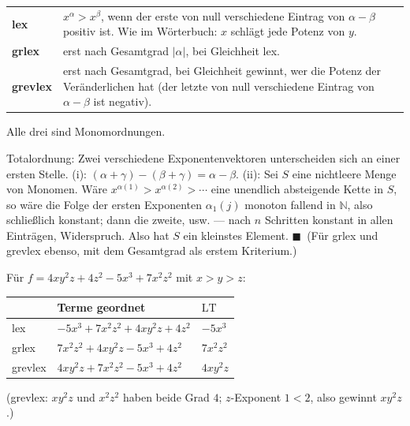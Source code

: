 \begin{merksatz}
\begin{center}
{\small
\renewcommand{\arraystretch}{1.5}
\begin{tabular}{@{}P{2.2cm}P{6.6cm}@{}}
\toprule
\textbf{lex} & $x^{\alpha} > x^{\beta}$, wenn der erste von null verschiedene Eintrag von $\alpha - \beta$ positiv ist. Wie im Wörterbuch: $x$ schlägt jede Potenz von $y$.\\
\textbf{grlex} & erst nach Gesamtgrad $|\alpha|$, bei Gleichheit lex.\\
\textbf{grevlex} & erst nach Gesamtgrad, bei Gleichheit gewinnt, wer die  Potenz der  Veränderlichen hat (der letzte von null verschiedene Eintrag von $\alpha - \beta$ ist negativ).\\
\bottomrule
\end{tabular}}
\end{center}
Alle drei sind Monomordnungen.

Totalordnung: Zwei verschiedene Exponentenvektoren unterscheiden sich an einer ersten Stelle. (i): $(\alpha + \gamma) - (\beta + \gamma) = \alpha - \beta$. (ii): Sei $S$ eine nichtleere Menge von Monomen. Wäre $x^{\alpha(1)} > x^{\alpha(2)} > \cdots$ eine unendlich absteigende Kette in $S$, so wäre die Folge der ersten Exponenten $\alpha_1(j)$ monoton fallend in $\mathbb N$, also schließlich konstant; dann die zweite, usw. --- nach $n$ Schritten konstant in allen Einträgen, Widerspruch. Also hat $S$ ein kleinstes Element. $\blacksquare$\ (Für grlex und grevlex ebenso, mit dem Gesamtgrad als erstem Kriterium.)

Für $f = 4xy^{2}z + 4z^{2} - 5x^{3} + 7x^{2}z^{2}$ mit $x > y > z$:
\begin{center}
{\small
\renewcommand{\arraystretch}{1.46}
\begin{tabular}{@{}P{1.4cm}P{4.6cm}P{2.0cm}@{}}
\toprule
 & \textbf{Terme geordnet} & $\mathrm{LT}$\\
\midrule
lex & $-5x^{3} + 7x^{2}z^{2} + 4xy^{2}z + 4z^{2}$ & $-5x^{3}$\\
grlex & $7x^{2}z^{2} + 4xy^{2}z - 5x^{3} + 4z^{2}$ & $7x^{2}z^{2}$\\
grevlex & $4xy^{2}z + 7x^{2}z^{2} - 5x^{3} + 4z^{2}$ & $4xy^{2}z$\\
\bottomrule
\end{tabular}}
\end{center}
(grevlex: $xy^{2}z$ und $x^{2}z^{2}$ haben beide Grad $4$; $z$-Exponent $1 < 2$, also gewinnt $xy^{2}z$.)


\end{merksatz}
